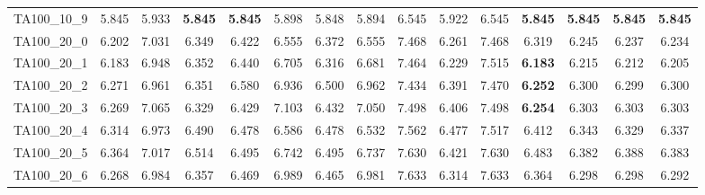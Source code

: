 \begin{tabular}{cc||ccccccccccccc}
TA100\_10\_9       & 5.845            & 5.933            & {\bf 5.845}      & {\bf 5.845}      & 5.898            & 5.848            & 5.894            & 6.545            & 5.922            & 6.545            & {\bf 5.845}      & {\bf 5.845}      & {\bf 5.845}      & {\bf 5.845}     \\ 
TA100\_20\_0       & 6.202            & 7.031            & 6.349            & 6.422            & 6.555            & 6.372            & 6.555            & 7.468            & 6.261            & 7.468            & 6.319            & 6.245            & 6.237            & 6.234           \\ 
TA100\_20\_1       & 6.183            & 6.948            & 6.352            & 6.440            & 6.705            & 6.316            & 6.681            & 7.464            & 6.229            & 7.515            & {\bf 6.183}      & 6.215            & 6.212            & 6.205           \\ 
TA100\_20\_2       & 6.271            & 6.961            & 6.351            & 6.580            & 6.936            & 6.500            & 6.962            & 7.434            & 6.391            & 7.470            & {\bf 6.252}      & 6.300            & 6.299            & 6.300           \\ 
TA100\_20\_3       & 6.269            & 7.065            & 6.329            & 6.429            & 7.103            & 6.432            & 7.050            & 7.498            & 6.406            & 7.498            & {\bf 6.254}      & 6.303            & 6.303            & 6.303           \\ 
TA100\_20\_4       & 6.314            & 6.973            & 6.490            & 6.478            & 6.586            & 6.478            & 6.532            & 7.562            & 6.477            & 7.517            & 6.412            & 6.343            & 6.329            & 6.337           \\ 
TA100\_20\_5       & 6.364            & 7.017            & 6.514            & 6.495            & 6.742            & 6.495            & 6.737            & 7.630            & 6.421            & 7.630            & 6.483            & 6.382            & 6.388            & 6.383           \\ 
TA100\_20\_6       & 6.268            & 6.984            & 6.357            & 6.469            & 6.989            & 6.465            & 6.981            & 7.633            & 6.314            & 7.633            & 6.364            & 6.298            & 6.298            & 6.292           \\ 

\end{tabular}
